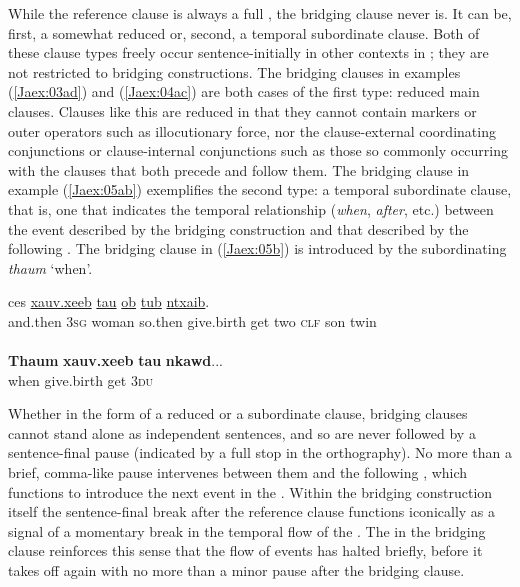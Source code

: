 \documentclass[output=paper]{LSP/langsci}
\begin{document}
While the reference clause is always a full , the bridging clause never is. It can be, first, a somewhat reduced  or, second, a temporal subordinate clause. Both of these clause types freely occur sentence-initially in other contexts in ; they are not restricted to bridging constructions. 
The bridging clauses in examples (\ref{Jaex:03ad}) and (\ref{Jaex:04ac}) are both cases of the first type: reduced main clauses. Clauses like this are reduced in that they cannot contain  markers or outer operators such as illocutionary force, nor the clause-external coordinating conjunctions or clause-internal  conjunctions such as those so commonly occurring with the clauses that both precede and follow them. The bridging clause in example (\ref{Jaex:05ab}) exemplifies the second type: a temporal subordinate clause, that is, one that indicates the temporal relationship (\textit{when}, \textit{after}, etc.) between the event described by the bridging construction and that described by the following . The bridging clause in (\ref{Jaex:05b}) is introduced by the subordinating  \textit{thaum } `when'.
 
\begin{exe}
\ex \label{Jaex:05ab}
\begin{xlist}
\ex \label{Jaex:05a}
\gll ces \underline{} \underline{} \underline{} \underline{xauv.xeeb} \underline{tau} \underline{ob} \underline{} \underline{tub} \underline{ntxaib}.\\
and.then 3\textsc{sg} woman so.then give.birth get two \textsc{clf} son twin\\
\glt {}\\
\ex \label{Jaex:05b}
\gll \textbf{Thaum} \textbf{xauv.xeeb} \textbf{tau} \textbf{nkawd}...\\     	      
    when  give.birth get 3\textsc{du}\\
\glt {} \citep[][31]{vang90}
\end{xlist}
\end{exe}

Whether in the form of a reduced  or a subordinate clause, bridging clauses cannot stand alone as independent sentences, and so are never followed by a sentence-final pause (indicated by a full stop in the orthography). No more than a brief, comma-like pause intervenes between them and the following , which functions to introduce the next event in the . Within the bridging construction itself the sentence-final break after the reference clause functions iconically as a signal of a momentary break in the temporal flow of the . The  in the bridging clause reinforces this sense that the  flow of events has halted briefly, before it takes off again with no more than a minor pause after the bridging clause.
 
\end{document}
